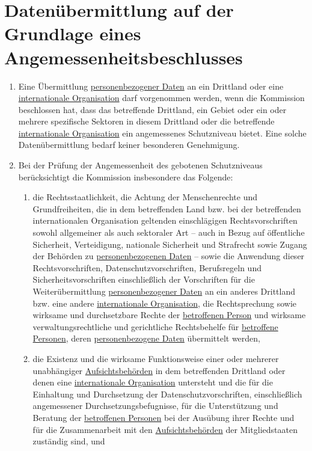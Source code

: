 \chapter{Datenübermittlung auf der Grundlage eines Angemessenheitsbeschlusses}
\label{ch:45}

\begin{enumerate}

  \item Eine Übermittlung \hyperref[itm:04-1]{personenbezogener Daten} an ein Drittland oder eine \hyperref[itm:04-26]
   {internationale Organisation} darf vorgenommen werden, wenn die Kommission beschlossen hat, dass das betreffende
   Drittland, ein Gebiet oder ein oder mehrere spezifische Sektoren in diesem Drittland oder die betreffende \hyperref
   [itm:04-26]{internationale Organisation} ein angemessenes Schutzniveau bietet. Eine solche Datenübermittlung bedarf
   keiner besonderen Genehmigung.%
  \label{itm:45-1}

  \item Bei der Prüfung der Angemessenheit des gebotenen Schutzniveaus berücksichtigt die Kommission insbesondere das
   Folgende:%
  \label{itm:45-2}

  \begin{enumerate}
  
    \item die Rechtsstaatlichkeit, die Achtung der Menschenrechte und Grundfreiheiten, die in dem betreffenden Land bzw.
     bei der betreffenden internationalen Organisation geltenden einschlägigen Rechtsvorschriften sowohl allgemeiner
     als auch sektoraler Art -- auch in Bezug auf öffentliche Sicherheit, Verteidigung, nationale Sicherheit und
     Strafrecht sowie Zugang der Behörden zu \hyperref[itm:04-1]{personenbezogenen Daten} -- sowie die Anwendung dieser
     Rechtsvorschriften, Datenschutzvorschriften, Berufsregeln und Sicherheitsvorschriften einschließlich der
     Vorschriften für die Weiterübermittlung \hyperref[itm:04-1]{personenbezogener Daten} an ein anderes Drittland bzw.
     eine andere \hyperref[itm:04-26]{internationale Organisation}, die Rechtsprechung sowie wirksame und durchsetzbare
     Rechte der \hyperref[itm:04-1]{betroffenen Person} und wirksame verwaltungsrechtliche und gerichtliche
     Rechtsbehelfe für \hyperref[itm:04-1]{betroffene Personen}, deren \hyperref[itm:04-1]{personenbezogene Daten}
     übermittelt werden,%
    \label{itm:45-2a}

    \item die Existenz und die wirksame Funktionsweise einer oder mehrerer unabhängiger \hyperref[itm:04-21]
     {Aufsichtsbehörden} in dem betreffenden Drittland oder denen eine \hyperref[itm:04-26]
     {internationale Organisation} untersteht und die für die Einhaltung und Durchsetzung der Datenschutzvorschriften,
     einschließlich angemessener Durchsetzungsbefugnisse, für die Unterstützung und Beratung der \hyperref[itm:04-1]
     {betroffenen Personen} bei der Ausübung ihrer Rechte und für die Zusammenarbeit mit den \hyperref[itm:04-21]
     {Aufsichtsbehörden} der Mitgliedstaaten zuständig sind, und%
    \label{itm:45-2b}


\end{enumerate}
\end{enumerate}
